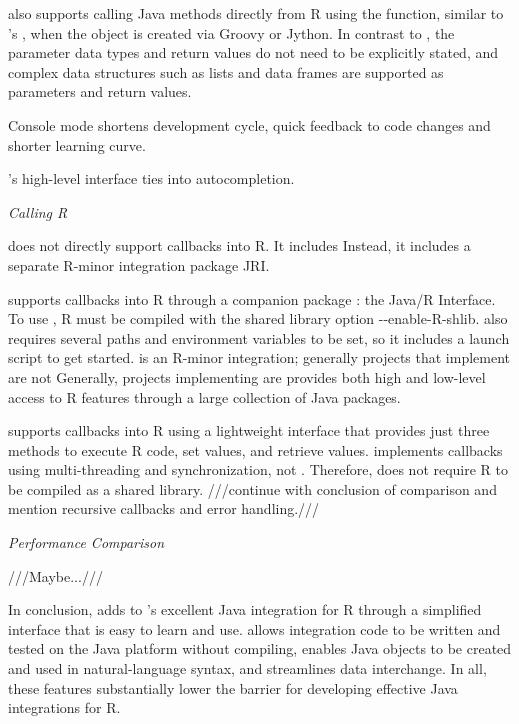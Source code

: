 also supports calling Java methods directly from R using the  function, similar to 's , when the object is created via Groovy or Jython. In contrast to , the parameter data types and return values do not need to be explicitly stated, and complex data structures such as lists and data frames are supported as parameters and return values.

Console mode shortens development cycle, quick feedback to code changes and shorter learning curve.

's high-level interface ties into autocompletion. 

\noindent \textit{Calling R}

\noindent {} does not directly support callbacks into R. It includes  Instead, it includes a separate R-minor integration package JRI.

supports callbacks into R through a companion package : the Java/R Interface. To use , R must be compiled with the shared library option -{}-enable-R-shlib.  also requires several paths and environment variables to be set, so it includes a launch script to get started.  is an R-minor integration; generally projects that implement  are not  Generally, projects implementing  are   provides both high and low-level access to R features through a large collection of Java packages.

 supports callbacks into R using a lightweight interface that provides just three methods to execute R code, set values, and retrieve values.  implements callbacks using multi-threading and synchronization, not . Therefore,  does not require R to be compiled as a shared library. ///continue with conclusion of comparison and mention recursive callbacks and error handling.///

\noindent \textit{Performance Comparison}

\noindent ///Maybe...///

In conclusion,  adds to 's excellent Java integration for R through a simplified interface that is easy to learn and use.  allows integration code to be written and tested on the Java platform without compiling, enables Java objects to be created and used in natural-language syntax, and streamlines data interchange. In all, these features substantially lower the barrier for developing effective Java integrations for R.

